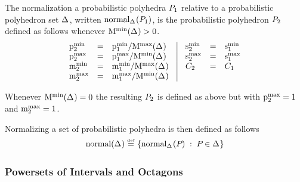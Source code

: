 \begin{definition}

\newcommand{\munder}{\underline{m}}
\newcommand{\mover}{\overline{m}}

The normalization a probabilistic polyhedra $ P_{1} $ relative to a
probabilistic polyhedron set $ \Delta_{} $, written $
\text{normal}_{\Delta_{}}(P_{1}) $, is the probabilistic polyhedron $ P_{2} $
defined as follows whenever $ \mathrm{M}^\mathrm{min} (\Delta_{}) > 0 $.
\[
\begin{array}{lcl@{\hspace{0.35cm}}|@{\hspace{0.35cm}}lcl}
\pmin{2} &=& \pmin{1} / \ppmmax{\pps{}} &
\smin{2} &=& \smin{1}\\
\pmax{2} &=& \pmax{1} / \ppmmin{\pps{}} &
\smax{2} &=&\smax{1} \\
\mmin{2} &=& \mmin{1} / \ppmmax{\pps{}} & \getpoly{2} &=& \getpoly{1} \\
\mmax{2} &=& \mmax{1} / \ppmmin{\pps{}} \\
\end{array}
\]

Whenever $ \mathrm{M}^\mathrm{min} (\Delta_{}) = 0 $ the resulting $ P_{2} $ is defined
as above but with $\mathrm{p}^\mathrm{max}_{2} = 1$ and $\mathrm{m}^\mathrm{max}_{2} = 1$.
\end{definition}

Normalizing a set of probabilistic polyhedra is then defined as follows
$$ \text{normal}(\Delta_{}) \stackrel{\smash{\scriptscriptstyle \mathrm{def}}}= \left\{ \text{normal}_{\Delta_{}}(P_{}) \;:\; P_{} \in
  \Delta_{} \right\} $$

%

\subsubsection{Powersets of Intervals and
  Octagons} \label{sec:psimpler}

